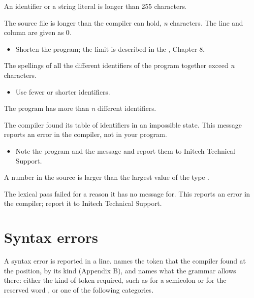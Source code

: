 An identifier or a string literal is longer than 255 characters.

The source file is longer than the compiler can hold, \textit{n} characters.
The line and column are given as 0.
\begin{itemize}
\item Shorten the program; the limit is described in the , Chapter 8.
\end{itemize}

The spellings of all the different identifiers of the program together
exceed \textit{n} characters.
\begin{itemize}
\item Use fewer or shorter identifiers.
\end{itemize}

The program has more than \textit{n} different identifiers.

The compiler found its table of identifiers in an impossible state.  This
message reports an error in the compiler, not in your program.
\begin{itemize}
\item Note the program and the message and report them to Initech
  Technical Support.
\end{itemize}

A number in the source is larger than the largest value of the type
.

The lexical pass failed for a reason it has no message for.  This reports
an error in the compiler; report it to Initech Technical Support.

\section{Syntax errors}
A syntax error is reported in a  line.  
names the token that the compiler found at the position, by its kind
(Appendix B), and  names what the grammar allows there:
either the kind of token required, such as  for a semicolon or
 for the reserved word , or one of the following
categories.

